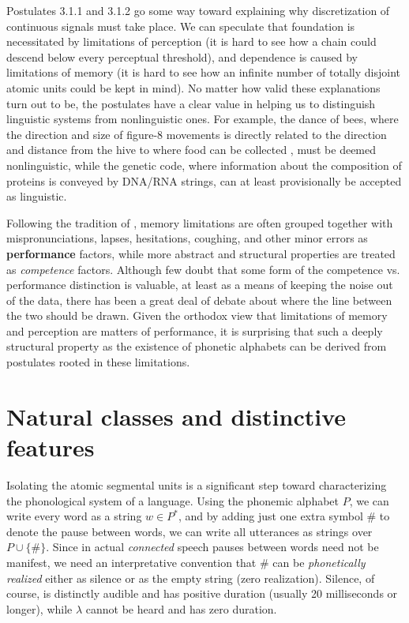 Postulates 3.1.1 and 3.1.2 go some way toward explaining why discretization of
continuous signals must take place. We can speculate that foundation is
necessitated by limitations of perception (it is hard to see how a chain could
descend below every perceptual threshold), and dependence is caused by
limitations of memory (it is hard to see how an infinite number of totally
disjoint atomic units could be kept in mind). No matter how valid these
explanations turn out to be, the postulates have a clear value in helping us
to distinguish linguistic systems from nonlinguistic ones. For example, the
dance of bees, where the direction and size of figure-8 movements is directly
related to the direction and distance from the hive to where food can be
collected \cite{Frisch:1967}, must be deemed nonlinguistic, while the genetic
code, where information about the composition of proteins is conveyed by
DNA/RNA strings, can at least provisionally be accepted as linguistic.
 

Following the tradition of , memory limitations are
often grouped together with mispronunciations, lapses, hesitations, coughing,
and other minor errors as {\bf performance}
factors, while more abstract and
structural properties are treated as {\it competence} factors. Although few
doubt that some form of the competence vs. performance distinction is
valuable, at least as a means of keeping the noise out of the data, there has
been a great deal of debate about where the line between the two should be
drawn. Given the orthodox view that limitations of memory and perception are
matters of performance, it is surprising that such a deeply structural
property as the existence of phonetic alphabets can be derived from postulates
rooted in these limitations.

\section{Natural classes and distinctive features}

Isolating the atomic segmental units is a significant step toward
characterizing the phonological system of a language. Using the phonemic
alphabet $P$, we can write every word as a string $w \in P^*$, and by adding
just one extra symbol \# to denote the pause between words, we can write all
utterances as strings over $P \cup \{\#\}$.  Since in actual {\it connected}
speech pauses between words need not be manifest, we need an interpretative
convention that \# can be {\it phonetically realized} either as silence or as
the empty string (zero realization). Silence, of course, is distinctly audible
and has positive duration (usually 20 milliseconds or longer), while $\lambda$
cannot be heard and has zero duration.  
 

